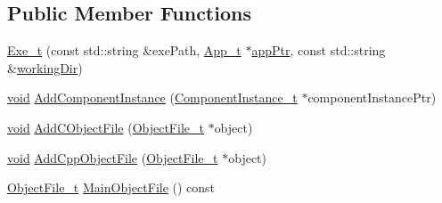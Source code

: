 \subsection*{Public Member Functions}
\begin{DoxyCompactItemize}
\item 
\hyperlink{structmodel_1_1_exe__t_a260e1622d00506896377772df7e01bdb}{Exe\+\_\+t} (const std\+::string \&exe\+Path, \hyperlink{structmodel_1_1_app__t}{App\+\_\+t} $\ast$\hyperlink{structmodel_1_1_exe__t_a8b465b9d1fcfcfc6d990b3aeacffe8a9}{app\+Ptr}, const std\+::string \&\hyperlink{structmodel_1_1_exe__t_a3356bfd82375ed963020e7239c84d955}{working\+Dir})
\item 
\hyperlink{_t_e_m_p_l_a_t_e__cdef_8h_ac9c84fa68bbad002983e35ce3663c686}{void} \hyperlink{structmodel_1_1_exe__t_ae7719e6a05129ae4ceb230a7120b8701}{Add\+Component\+Instance} (\hyperlink{structmodel_1_1_component_instance__t}{Component\+Instance\+\_\+t} $\ast$component\+Instance\+Ptr)
\item 
\hyperlink{_t_e_m_p_l_a_t_e__cdef_8h_ac9c84fa68bbad002983e35ce3663c686}{void} \hyperlink{structmodel_1_1_exe__t_a2cea7eabdefad7d2256636ccf9859ea6}{Add\+C\+Object\+File} (\hyperlink{structmodel_1_1_object_file__t}{Object\+File\+\_\+t} $\ast$object)
\item 
\hyperlink{_t_e_m_p_l_a_t_e__cdef_8h_ac9c84fa68bbad002983e35ce3663c686}{void} \hyperlink{structmodel_1_1_exe__t_a13d3d59b81dc0ca552986b0c6fc02e61}{Add\+Cpp\+Object\+File} (\hyperlink{structmodel_1_1_object_file__t}{Object\+File\+\_\+t} $\ast$object)
\item 
\hyperlink{structmodel_1_1_object_file__t}{Object\+File\+\_\+t} \hyperlink{structmodel_1_1_exe__t_aacc480b1d792e676472af02dcbd78d49}{Main\+Object\+File} () const 
\end{DoxyCompactItemize}

